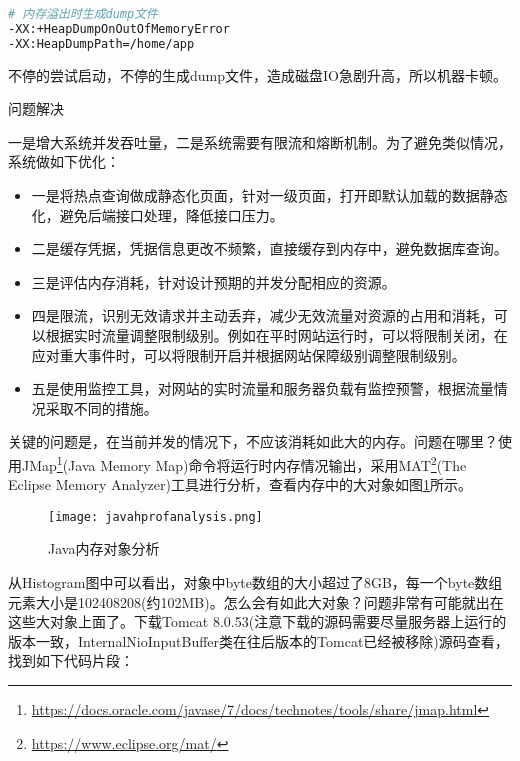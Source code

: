 \documentclass[8pt]{book}
\makeatletter
\numberwithin{dummy}{section}
\theoremstyle{ocrenumbox}
\theoremstyle{blacknumex}
\theoremstyle{blacknumbox}
\theoremstyle{ocrenum}
\renewcommand\paragraph{\@startsection{paragraph}{4}{\z@}
	{-2ex \@plus-.2ex \@minus .2ex}
	{.1ex}
	{\normalfont\small\sffamily\bfseries}}
\makeatother
\begin{document}
\begin{lstlisting}[language=Bash]
# 内存溢出时生成dump文件
-XX:+HeapDumpOnOutOfMemoryError 
-XX:HeapDumpPath=/home/app
\end{lstlisting}

不停的尝试启动，不停的生成dump文件，造成磁盘IO急剧升高，所以机器卡顿。

\paragraph{问题解决}

一是增大系统并发吞吐量，二是系统需要有限流和熔断机制。为了避免类似情况，系统做如下优化：

\begin{itemize}
	\item {一是将热点查询做成静态化页面，针对一级页面，打开即默认加载的数据静态化，避免后端接口处理，降低接口压力。}
	\item {二是缓存凭据，凭据信息更改不频繁，直接缓存到内存中，避免数据库查询。}
	\item {三是评估内存消耗，针对设计预期的并发分配相应的资源。}
	\item{四是限流，识别无效请求并主动丢弃，减少无效流量对资源的占用和消耗，可以根据实时流量调整限制级别。例如在平时网站运行时，可以将限制关闭，在应对重大事件时，可以将限制开启并根据网站保障级别调整限制级别。}
	\item {五是使用监控工具，对网站的实时流量和服务器负载有监控预警，根据流量情况采取不同的措施。}
\end{itemize}

关键的问题是，在当前并发的情况下，不应该消耗如此大的内存。问题在哪里？使用JMap\footnote{\url{https://docs.oracle.com/javase/7/docs/technotes/tools/share/jmap.html}}(Java Memory Map)命令将运行时内存情况输出，采用MAT\footnote{\url{https://www.eclipse.org/mat/}}(The Eclipse Memory Analyzer)工具进行分析，查看内存中的大对象如图\ref{fig:javahprofanalysis}所示。

\begin{figure}[htbp]
	\centering
	\texttt{[image: javahprofanalysis.png]}
	\caption{Java内存对象分析}
	\label{fig:javahprofanalysis}
\end{figure}

从Histogram图中可以看出，对象中byte数组的大小超过了8GB，每一个byte数组元素大小是102408208(约102MB)。怎么会有如此大对象？问题非常有可能就出在这些大对象上面了。下载Tomcat 8.0.53(注意下载的源码需要尽量服务器上运行的版本一致，InternalNioInputBuffer类在往后版本的Tomcat已经被移除)源码查看，找到如下代码片段：
\end{document}
